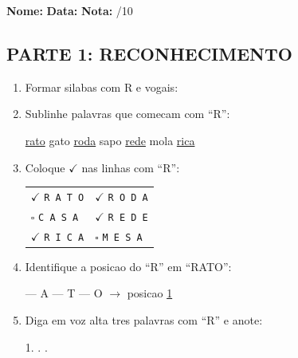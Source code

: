 \begin{exercicio}
\noindent\textbf{Nome:} \underline{\hspace{3.2cm}} \quad \textbf{Data:} \underline{\hspace{1.6cm}} \quad \textbf{Nota:} \underline{\hspace{0.9cm}}/10

\subsection*{PARTE 1: RECONHECIMENTO}

\begin{enumerate}
  \item Formar silabas com R e vogais:
  \begin{center}
   \quad {} \quad {} \quad {} \quad {}
  \end{center}

  \item Sublinhe palavras que comecam com ``R'':
  \begin{center}
  \uline{rato} \quad gato \quad \uline{roda} \quad sapo \quad \uline{rede} \quad mola \quad \uline{rica}
  \end{center}

  \item Coloque $\checkmark$ nas linhas com ``R'':
  \begin{center}
  \begin{tabular}{ll}
  $\checkmark$ \texttt{R A T O} & $\checkmark$ \texttt{R O D A} \\
  $\square$ \texttt{C A S A} & $\checkmark$ \texttt{R E D E} \\
  $\checkmark$ \texttt{R I C A} & $\square$ \texttt{M E S A}
  \end{tabular}
  \end{center}

  \item Identifique a posicao do ``R'' em ``RATO'':
  \begin{center}
   --- A --- T --- O $\rightarrow$ posicao \underline{1}
  \end{center}

  \item Diga em voz alta tres palavras com ``R'' e anote:
  \begin{center}
  1. \underline{\hspace{4cm}} . \underline{\hspace{4cm}} . \underline{\hspace{4cm}}
  \end{center}
\end{enumerate}


\end{exercicio}
